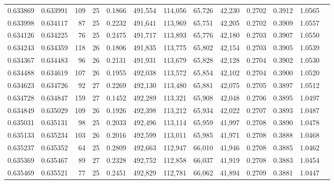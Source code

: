 \begin{tabular}{rrrrrrrrrrrrr}
0.633869 & 0.633991 &   109 &  25 &                                     0.1866 & 491,554 & 114,056 &  65,726 &  42,230 & 0.2702 & 0.3912 & 1.0565 \\
0.633998 & 0.634117 &    87 &  25 &                                     0.2232 & 491,641 & 113,969 &  65,751 &  42,205 & 0.2702 & 0.3909 & 1.0557 \\
0.634126 & 0.634225 &    76 &  25 &                                     0.2475 & 491,717 & 113,893 &  65,776 &  42,180 & 0.2703 & 0.3907 & 1.0550 \\
0.634243 & 0.634359 &   118 &  26 &                                     0.1806 & 491,835 & 113,775 &  65,802 &  42,154 & 0.2703 & 0.3905 & 1.0539 \\
0.634367 & 0.634483 &    96 &  26 &                                     0.2131 & 491,931 & 113,679 &  65,828 &  42,128 & 0.2704 & 0.3902 & 1.0530 \\
0.634488 & 0.634619 &   107 &  26 &                                     0.1955 & 492,038 & 113,572 &  65,854 &  42,102 & 0.2704 & 0.3900 & 1.0520 \\
0.634623 & 0.634726 &    92 &  27 &                                     0.2269 & 492,130 & 113,480 &  65,881 &  42,075 & 0.2705 & 0.3897 & 1.0512 \\
0.634728 & 0.634847 &   159 &  27 &                                     0.1452 & 492,289 & 113,321 &  65,908 &  42,048 & 0.2706 & 0.3895 & 1.0497 \\
0.634849 & 0.635029 &   109 &  26 &                                     0.1926 & 492,398 & 113,212 &  65,934 &  42,022 & 0.2707 & 0.3893 & 1.0487 \\
0.635031 & 0.635131 &    98 &  25 &                                     0.2033 & 492,496 & 113,114 &  65,959 &  41,997 & 0.2708 & 0.3890 & 1.0478 \\
0.635133 & 0.635234 &   103 &  26 &                                     0.2016 & 492,599 & 113,011 &  65,985 &  41,971 & 0.2708 & 0.3888 & 1.0468 \\
0.635237 & 0.635352 &    64 &  25 &                                     0.2809 & 492,663 & 112,947 &  66,010 &  41,946 & 0.2708 & 0.3885 & 1.0462 \\
0.635369 & 0.635467 &    89 &  27 &                                     0.2328 & 492,752 & 112,858 &  66,037 &  41,919 & 0.2708 & 0.3883 & 1.0454 \\
0.635469 & 0.635521 &    77 &  25 &                                     0.2451 & 492,829 & 112,781 &  66,062 &  41,894 & 0.2709 & 0.3881 & 1.0447 \\

\end{tabular}
